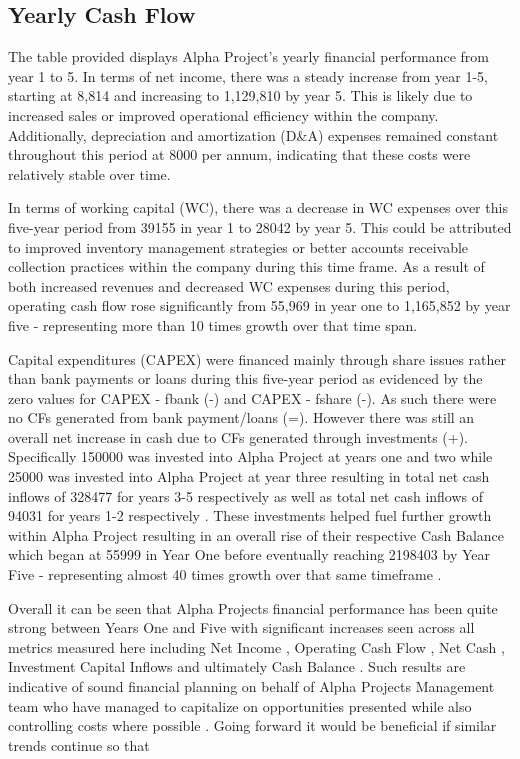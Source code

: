 

\subsection{Yearly Cash Flow} \label{sec:title}

The table provided displays Alpha Project's yearly financial performance from year 1 to 5. In terms of net income, there was a steady increase from year 1-5, starting at 8,814 and increasing to 1,129,810 by year 5. This is likely due to increased sales or improved operational efficiency within the company. Additionally, depreciation and amortization (D&A) expenses remained constant throughout this period at 8000 per annum, indicating that these costs were relatively stable over time. 

In terms of working capital (WC), there was a decrease in WC expenses over this five-year period from 39155 in year 1 to 28042 by year 5. This could be attributed to improved inventory management strategies or better accounts receivable collection practices within the company during this time frame. As a result of both increased revenues and decreased WC expenses during this period, operating cash flow rose significantly from 55,969 in year one to 1,165,852 by year five - representing more than 10 times growth over that time span. 

Capital expenditures (CAPEX) were financed mainly through share issues rather than bank payments or loans during this five-year period as evidenced by the zero values for CAPEX - fbank (-) and CAPEX - fshare (-). As such there were no CFs generated from bank payment/loans (=). However there was still an overall net increase in cash due to CFs generated through investments (+). Specifically 150000 was invested into Alpha Project at years one and two while 25000 was invested into Alpha Project at year three resulting in total net cash inflows of 328477 for years 3-5 respectively as well as total net cash inflows of 94031 for years 1-2 respectively . These investments helped fuel further growth within Alpha Project resulting in an overall rise of their respective Cash Balance which began at 55999 in Year One before eventually reaching 2198403 by Year Five - representing almost 40 times growth over that same timeframe . 

Overall it can be seen that Alpha Projects financial performance has been quite strong between Years One and Five with significant increases seen across all metrics measured here including Net Income , Operating Cash Flow , Net Cash , Investment Capital Inflows and ultimately Cash Balance . Such results are indicative of sound financial planning on behalf of Alpha Projects Management team who have managed to capitalize on opportunities presented while also controlling costs where possible . Going forward it would be beneficial if similar trends continue so that